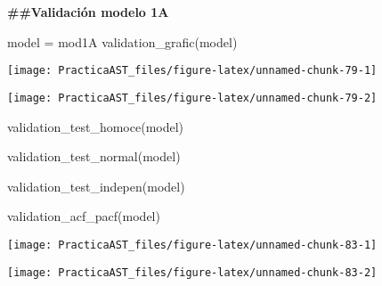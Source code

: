 \documentclass[
]{article}
\newenvironment{Shaded}{\begin{snugshade}}{\end{snugshade}}
\newcommand{\FunctionTok}[1]{\textcolor[rgb]{0.00,0.00,0.00}{#1}}
\newcommand{\NormalTok}[1]{#1}
\newcommand{\OtherTok}[1]{\textcolor[rgb]{0.56,0.35,0.01}{#1}}
\begin{document}
\textbf{\#\#Validación modelo 1A}

\begin{Shaded}
\begin{Highlighting}[]
\NormalTok{model }\OtherTok{=}\NormalTok{ mod1A        }
\FunctionTok{validation\_grafic}\NormalTok{(model)}
\end{Highlighting}
\end{Shaded}

\begin{center}\texttt{[image: PracticaAST\_files/figure-latex/unnamed-chunk-79-1]} \end{center}

\begin{center}\texttt{[image: PracticaAST\_files/figure-latex/unnamed-chunk-79-2]} \end{center}

\begin{Shaded}
\begin{Highlighting}[]
\FunctionTok{validation\_test\_homoce}\NormalTok{(model)}
\end{Highlighting}
\end{Shaded}

\begin{Shaded}
\begin{Highlighting}[]
\FunctionTok{validation\_test\_normal}\NormalTok{(model)}
\end{Highlighting}
\end{Shaded}

\begin{Shaded}
\begin{Highlighting}[]
\FunctionTok{validation\_test\_indepen}\NormalTok{(model)}
\end{Highlighting}
\end{Shaded}

\begin{Shaded}
\begin{Highlighting}[]
\FunctionTok{validation\_acf\_pacf}\NormalTok{(model)}
\end{Highlighting}
\end{Shaded}

\begin{center}\texttt{[image: PracticaAST\_files/figure-latex/unnamed-chunk-83-1]} \end{center}

\begin{center}\texttt{[image: PracticaAST\_files/figure-latex/unnamed-chunk-83-2]} \end{center}
\end{document}
